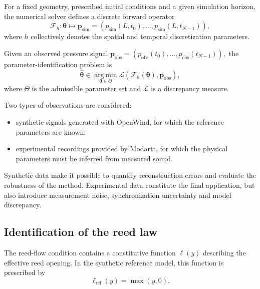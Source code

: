 \documentclass[11pt,a4paper]{report}
\theoremstyle{plain}
\theoremstyle{definition}
\begin{document}
For a fixed geometry, prescribed initial conditions and a given simulation
horizon, the numerical solver defines a discrete forward operator
\begin{equation}
\mathcal{F}_h:
\boldsymbol{\theta}
\longmapsto
\mathbf{p}_{\mathrm{sim}}
=
\left(
p_{\mathrm{sim}}(L,t_0),\ldots,
p_{\mathrm{sim}}(L,t_{N-1})
\right),
\label{eq:forward_map}
\end{equation}
where \(h\) collectively denotes the spatial and temporal discretization
parameters.

Given an observed pressure signal $\mathbf{p}_{\mathrm{obs}}=\left(p_{\mathrm{obs}}(t_0),\ldots,p_{\mathrm{obs}}(t_{N-1})\right),$ the parameter-identification problem is
\begin{equation}
\boxed{
\widehat{\boldsymbol{\theta}}
\in
\operatorname*{arg\,min}_{\boldsymbol{\theta}\in\Theta}
\mathcal{L}
\left(
\mathcal{F}_h(\boldsymbol{\theta}),
\mathbf{p}_{\mathrm{obs}}
\right),
}
\label{eq:inverse_problem}
\end{equation}
where \(\Theta\) is the admissible parameter set and \(\mathcal{L}\) is a
discrepancy measure.

Two types of observations are considered:
\begin{itemize}
    \item synthetic signals generated with OpenWind, for which the reference
    parameters are known;
    \item experimental recordings provided by Modartt, for which the physical
    parameters must be inferred from measured sound.
\end{itemize}

Synthetic data make it possible to quantify reconstruction errors and evaluate
the robustness of the method. Experimental data constitute the final
application, but also introduce measurement noise, synchronization uncertainty
and model discrepancy.

\subsection{Identification of the reed law}

The reed-flow condition contains a constitutive function \(\ell(y)\) describing
the effective reed opening. In the synthetic reference model, this function is
prescribed by
\begin{equation}
\ell_{\mathrm{ref}}(y)
=
\max(y,0).
\label{eq:reference_reed_law}
\end{equation}
\end{document}
